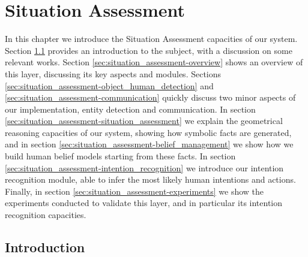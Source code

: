 
\chapter{Situation Assessment} %

\label{chapter:situation_assessment} %


In this chapter we introduce the Situation Assessment capacities of our system. Section \ref{sec:situation_assessment-intro} provides an introduction to the subject, with a discussion on some relevant works. Section \ref{sec:situation_assessment-overview} shows an overview of this layer, discussing its key aspects and modules. Sections \ref{sec:situation_assessment-object_human_detection} and \ref{sec:situation_assessment-communication} quickly discuss two minor aspects of our implementation, entity detection and communication. In section \ref{sec:situation_assessment-situation_assessment} we explain the geometrical reasoning capacities of our system, showing how symbolic facts are generated, and in section \ref{sec:situation_assessment-belief_management} we show how we build human belief models starting from these facts. In section \ref{sec:situation_assessment-intention_recognition} we introduce our intention recognition module, able to infer the most likely human intentions and actions. Finally, in section \ref{sec:situation_assessment-experiments} we show the experiments conducted to validate this layer, and in particular its intention recognition capacities.

\section{Introduction}
\label{sec:situation_assessment-intro}
